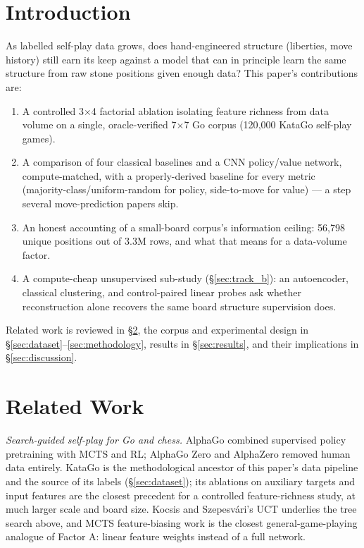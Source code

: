 \documentclass[conference,a4paper]{IEEEtran}
\begin{document}
\section{Introduction}
\label{sec:intro}
As labelled self-play data grows, does hand-engineered structure
(liberties, move history) still earn its keep against a model that can in
principle learn the same structure from raw stone positions given enough
data? This paper's contributions are:
\begin{enumerate}
  \item A controlled 3$\times$4 factorial ablation isolating feature
    richness from data volume on a single, oracle-verified 7$\times$7 Go
    corpus (120{,}000 KataGo self-play games).
  \item A comparison of four classical baselines and a CNN policy/value
    network, compute-matched, with a properly-derived baseline for every
    metric (majority-class/uniform-random for policy, side-to-move for
    value) --- a step several move-prediction papers skip.
  \item An honest accounting of a small-board corpus's information ceiling:
    56{,}798 unique positions out of 3.3M rows, and what that means for a
    data-volume factor.
  \item A compute-cheap unsupervised sub-study (\S\ref{sec:track_b}): an
    autoencoder, classical clustering, and control-paired linear probes ask
    whether reconstruction alone recovers the same board structure
    supervision does.
\end{enumerate}
Related work is reviewed in \S\ref{sec:related}, the corpus and experimental
design in \S\ref{sec:dataset}--\ref{sec:methodology}, results in
\S\ref{sec:results}, and their implications in \S\ref{sec:discussion}.

\section{Related Work}
\label{sec:related}
\textit{Search-guided self-play for Go and chess.} AlphaGo
\cite{silver2016mastering} combined supervised policy pretraining with
MCTS and RL; AlphaGo Zero \cite{silver2017mastering} and AlphaZero
\cite{silver2018general} removed human data entirely. KataGo
\cite{wu2019accelerating} is the methodological ancestor of this paper's
data pipeline and the source of its labels (\S\ref{sec:dataset}); its
ablations on auxiliary targets and input features are the closest precedent
for a controlled feature-richness study, at much larger scale and board
size. Kocsis and Szepesv\'ari's UCT \cite{kocsis2006bandit} underlies the
tree search above, and MCTS feature-biasing work \cite{soemers2019biasing}
is the closest general-game-playing analogue of Factor A: linear feature
weights instead of a full network.
\end{document}

